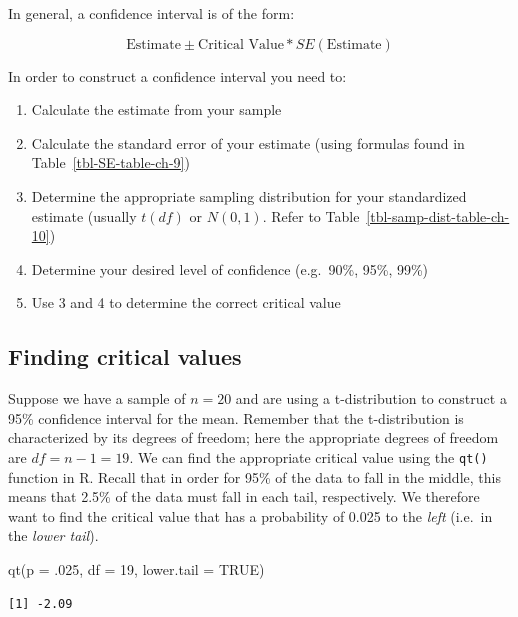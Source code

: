 \documentclass[
  letterpaper,
  DIV=11,
  numbers=noendperiod]{scrreprt}
\newenvironment{Shaded}{\begin{snugshade}}{\end{snugshade}}
\newcommand{\AttributeTok}[1]{\textcolor[rgb]{0.40,0.45,0.13}{#1}}
\newcommand{\ConstantTok}[1]{\textcolor[rgb]{0.56,0.35,0.01}{#1}}
\newcommand{\DecValTok}[1]{\textcolor[rgb]{0.68,0.00,0.00}{#1}}
\newcommand{\FunctionTok}[1]{\textcolor[rgb]{0.28,0.35,0.67}{#1}}
\newcommand{\NormalTok}[1]{\textcolor[rgb]{0.00,0.23,0.31}{#1}}
\providecommand{\tightlist}{%
  \setlength{\itemsep}{0pt}\setlength{\parskip}{0pt}}\usepackage{longtable,booktabs,array}
\theoremstyle{definition}
\theoremstyle{remark}
\begin{document}
In general, a confidence interval is of the form:

\[\text{Estimate} \pm \text{Critical Value} * SE(\text{Estimate})\]

In order to construct a confidence interval you need to:

\begin{enumerate}
\def\labelenumi{\arabic{enumi}.}
\tightlist
\item
  Calculate the estimate from your sample
\item
  Calculate the standard error of your estimate (using formulas found in
  Table~\ref{tbl-SE-table-ch-9})
\item
  Determine the appropriate sampling distribution for your standardized
  estimate (usually \(t(df)\) or \(N(0,1)\). Refer to
  Table~\ref{tbl-samp-dist-table-ch-10})
\item
  Determine your desired level of confidence (e.g.~90\%, 95\%, 99\%)
\item
  Use 3 and 4 to determine the correct critical value
\end{enumerate}

\hypertarget{finding-critical-values}{%
\subsection{Finding critical values}\label{finding-critical-values}}

Suppose we have a sample of \(n = 20\) and are using a t-distribution to
construct a 95\% confidence interval for the mean. Remember that the
t-distribution is characterized by its degrees of freedom; here the
appropriate degrees of freedom are \(df = n - 1 = 19\). We can find the
appropriate critical value using the \texttt{qt()} function in R. Recall
that in order for 95\% of the data to fall in the middle, this means
that 2.5\% of the data must fall in each tail, respectively. We
therefore want to find the critical value that has a probability of
0.025 to the \emph{left} (i.e.~in the \emph{lower tail}).

\begin{Shaded}
\begin{Highlighting}[]
\FunctionTok{qt}\NormalTok{(}\AttributeTok{p =}\NormalTok{ .}\DecValTok{025}\NormalTok{, }\AttributeTok{df =} \DecValTok{19}\NormalTok{, }\AttributeTok{lower.tail =} \ConstantTok{TRUE}\NormalTok{)}
\end{Highlighting}
\end{Shaded}

\begin{verbatim}
[1] -2.09
\end{verbatim}
\end{document}
